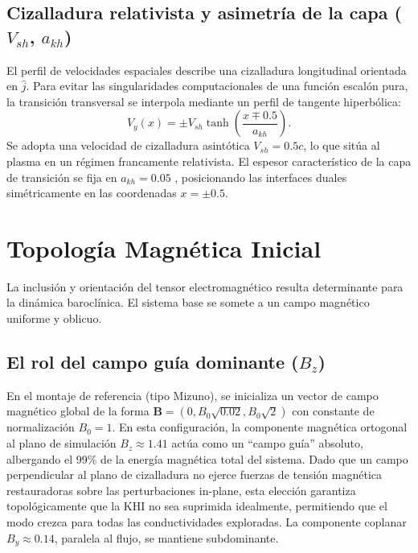 \subsection{Cizalladura relativista y asimetría de la capa ($V_{sh}$, $a_{kh}$)}

\primerparrafo El perfil de velocidades espaciales describe una cizalladura longitudinal orientada en $\hat{j}$. Para evitar las singularidades computacionales de una función escalón pura, la transición transversal se interpola mediante un perfil de tangente hiperbólica:
\begin{equation}
    V_y(x) = \pm V_{sh} \tanh\left(\frac{x \mp 0.5}{a_{kh}}\right).
\end{equation}
Se adopta una velocidad de cizalladura asintótica $V_{sh} = 0.5c$, lo que sitúa al plasma en un régimen francamente relativista. El espesor característico de la capa de transición se fija en $a_{kh} = 0.05$ , posicionando las interfaces duales simétricamente en las coordenadas $x = \pm 0.5$.

\section{Topología Magnética Inicial}

\primerparrafo La inclusión y orientación del tensor electromagnético resulta determinante para la dinámica baroclínica. El sistema base se somete a un campo magnético uniforme y oblicuo.

\subsection{El rol del campo guía dominante ($B_z$)}

\primerparrafo En el montaje de referencia (tipo Mizuno), se inicializa un vector de campo magnético global de la forma $\mathbf{B} = (0, B_0\sqrt{0.02}, B_0\sqrt{2})$ con constante de normalización $B_0=1$. En esta configuración, la componente magnética ortogonal al plano de simulación $B_z \approx 1.41$ actúa como un ``campo guía'' absoluto, albergando el 99\% de la energía magnética total del sistema. Dado que un campo perpendicular al plano de cizalladura no ejerce fuerzas de tensión magnética restauradoras sobre las perturbaciones in-plane, esta elección garantiza topológicamente que la KHI no sea suprimida idealmente, permitiendo que el modo crezca para todas las conductividades exploradas. La componente coplanar $B_y \approx 0.14$, paralela al flujo, se mantiene subdominante.

